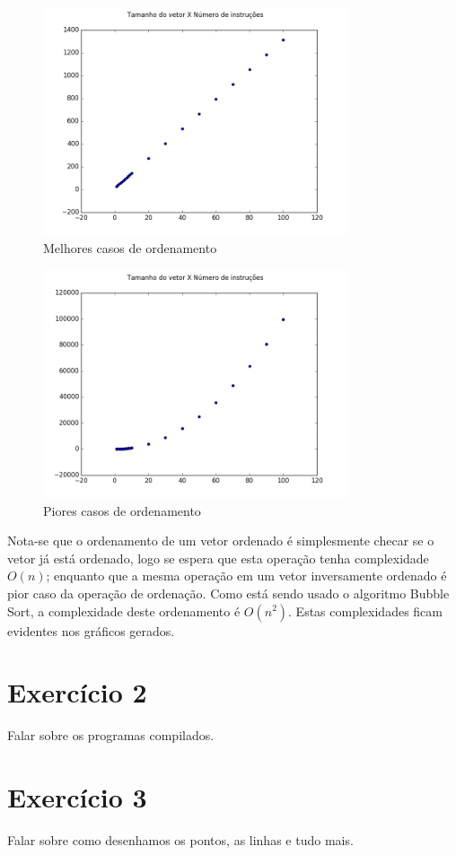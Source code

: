 \documentclass[12pt, a4paper, twoside]{article}
\begin{document}
\begin{figure}
    \centering
    \includegraphics[width=0.8\textwidth]{ex1/best.png}
    \caption{Melhores casos de ordenamento}
\end{figure}


\begin{figure}
    \centering
    \includegraphics[width=0.8\textwidth]{ex1/worst.png}
    \caption{Piores casos de ordenamento}
\end{figure}

Nota-se que o ordenamento de um vetor ordenado é simplesmente checar se o vetor já está ordenado, logo se espera que esta operação tenha complexidade $O(n)$; enquanto que a mesma operação em um vetor inversamente ordenado é pior caso da operação de ordenação. Como está sendo usado o algoritmo Bubble Sort, a complexidade deste ordenamento é $O(n^2)$. Estas complexidades ficam evidentes nos gráficos gerados.

\section{Exercício 2}

Falar sobre os programas compilados.

\section{Exercício 3}

Falar sobre como desenhamos os pontos, as linhas e tudo mais.
\end{document}
